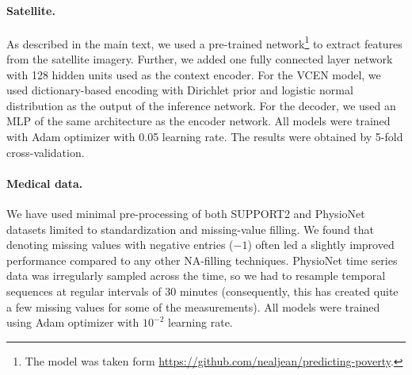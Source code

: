 \documentclass[twoside,11pt]{article}
\begin{document}
\paragraph{Satellite.}
As described in the main text, we used a pre-trained {\VGG} network\footnote{The model was taken form \url{https://github.com/nealjean/predicting-poverty}.} to extract features from the satellite imagery.
Further, we added one fully connected layer network with 128 hidden units used as the context encoder.
For the VCEN model, we used dictionary-based encoding with Dirichlet prior and logistic normal distribution as the output of the inference network.
For the decoder, we used an MLP of the same architecture as the encoder network.
All models were trained with Adam optimizer with 0.05 learning rate.
The results were obtained by 5-fold cross-validation.

\paragraph{Medical data.}
We have used minimal pre-processing of both SUPPORT2 and PhysioNet datasets limited to standardization and missing-value filling.
We found that denoting missing values with negative entries ($-1$) often led a slightly improved performance compared to any other NA-filling techniques.
PhysioNet time series data was irregularly sampled across the time, so we had to resample temporal sequences at regular intervals of 30 minutes (consequently, this has created quite a few missing values for some of the measurements).
All models were trained using Adam optimizer with $10^{-2}$ learning rate.
\end{document}
